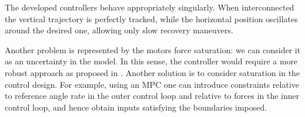 \documentclass[11pt,a4paper]{scrartcl}
\begin{document}
The developed controllers behave appropriately singularly. When interconnected the vertical trajectory is perfectly tracked, while the horizontal position oscillates around the desired one, allowing only slow recovery maneuvers.

Another problem is represented by the motors force saturation: we can consider it as an uncertainty in the model. In this sense, the controller would require a more robust approach as proposed in \cite{lanzon2014flight}. Another solution is to consider saturation in the control design. For example, using an MPC one can introduce constraints relative to reference angle rate in the outer control loop and relative to forces in the inner control loop, and hence obtain inputs satisfying the boundaries imposed.

\clearpage




\end{document}
